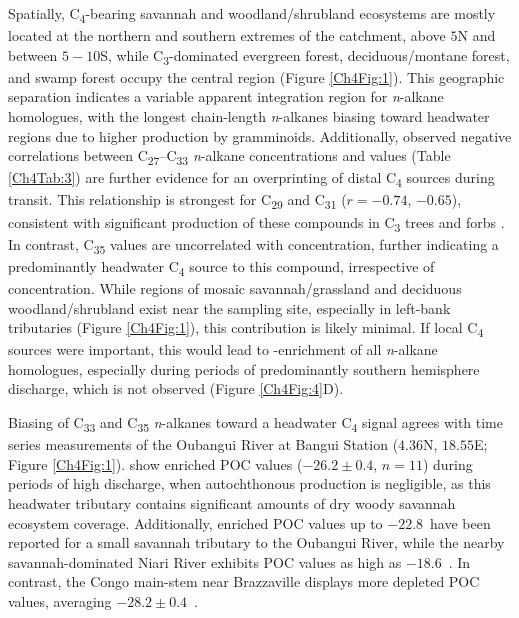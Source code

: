 Spatially, C\textsubscript{4}-bearing savannah and woodland/shrubland ecosystems are mostly located at the northern and southern extremes of the catchment, above $5$\textdegree N and between $5-10$\textdegree S, while C\textsubscript{3}-dominated evergreen forest, deciduous/montane forest, and swamp forest occupy the central region (Figure \ref{Ch4Fig:1}). This geographic separation indicates a variable apparent integration region for \textit{n}-alkane homologues, with the longest chain-length \textit{n}-alkanes biasing toward headwater regions due to higher production by gramminoids. Additionally, observed negative correlations between C\textsubscript{27}--C\textsubscript{33} \textit{n}-alkane concentrations and  values (Table \ref{Ch4Tab:3}) are further evidence for an overprinting of distal C\textsubscript{4} sources during transit. This relationship is strongest for C\textsubscript{29} and C\textsubscript{31} ($r = -0.74$, $-0.65$), consistent with significant production of these compounds in C\textsubscript{3} trees and forbs \citep{Rommerskirchen:2006gr,Vogts:2009fb}. In contrast, C\textsubscript{35}  values are uncorrelated with concentration, further indicating a predominantly headwater C\textsubscript{4} source to this compound, irrespective of concentration. While regions of mosaic savannah/grassland and deciduous woodland/shrubland exist near the sampling site, especially in left-bank tributaries (Figure \ref{Ch4Fig:1}), this contribution is likely minimal. If local C\textsubscript{4} sources were important, this would lead to -enrichment of all \textit{n}-alkane homologues, especially during periods of predominantly southern hemisphere discharge, which is not observed (Figure \ref{Ch4Fig:4}D).

Biasing of C\textsubscript{33} and C\textsubscript{35} \textit{n}-alkanes toward a headwater C\textsubscript{4} signal agrees with time series measurements of the Oubangui River at Bangui Station ($4.36$\textdegree N, $18.55$\textdegree E; Figure \ref{Ch4Fig:1}). \citet{Bouillon:2012cw} show enriched POC  values ($-26.2 \pm 0.4$\textperthousand, $n = 11$) during periods of high discharge, when autochthonous production is negligible, as this headwater tributary contains significant amounts of dry woody savannah ecosystem coverage. Additionally, enriched POC  values up to $-22.8$\textperthousand\ have been reported for a small savannah tributary to the Oubangui River, while the nearby savannah-dominated Niari River exhibits POC  values as high as $-18.6$\textperthousand\ \citep{Mariotti:1991vx,Bouillon:2014ko}. In contrast, the Congo main-stem near Brazzaville displays more depleted POC  values, averaging $-28.2 \pm 0.4$\textperthousand\ \citep[$n = 5$;][]{Spencer:2012en}.

